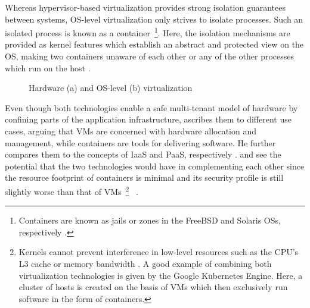 Whereas hypervisor-based virtualization provides strong isolation guarantees between systems, \acs{OS}-level virtualization only strives to isolate processes. Such an isolated process is known as a container~\footnote{Containers are known as jails or zones in the FreeBSD and Solaris \acsp{OS}, respectively \cite[p.~2]{eder2016hypervisor}.}. Here, the isolation mechanisms are provided as kernel features which establish an abstract and protected view on the \acs{OS}, making two containers unaware of each other or any of the other processes which run on the host \cite[p.~2]{merkel2014docker} \cite[pp.~1--2]{eder2016hypervisor}.

\begin{figure}[htp]
    \centering
    \qquad

    \caption[Hardware and OS-level virtualization]{Hardware (a) and OS-level (b) virtualization \cite[p.~387]{morabito2015hypervisors}}
    \label{fig:hypervisor-container-virtualization}
\end{figure}

\FloatBarrier

Even though both technologies enable a safe multi-tenant model of hardware by confining parts of the application infrastructure, \citeauthor{pahl2015containerization} ascribes them to different use cases, arguing that \acp{VM} are concerned with hardware allocation and management, while containers are tools for delivering software. He further compares them to the concepts of \acs{IaaS} and \acs{PaaS}, respectively \cite[p.~24]{pahl2015containerization}. \citeauthor{eder2016hypervisor} and \citeauthor{merkel2014docker} see the potential that the two technologies would have in complementing each other since the resource footprint of containers is minimal and its security profile is still slightly worse than that of \acsp{VM}~\footnote{Kernels cannot prevent interference in low-level resources such as the \acs{CPU}'s L3 cache or memory bandwidth \cite[p.~52]{burns2016borg}. A good example of combining both virtualization technologies is given by the Google Kubernetes Engine. Here, a cluster of hosts is created on the basis of \acsp{VM} which then exclusively run software in the form of containers.}~\cite[p.~6]{eder2016hypervisor} \cite[p.~2]{merkel2014docker}.

